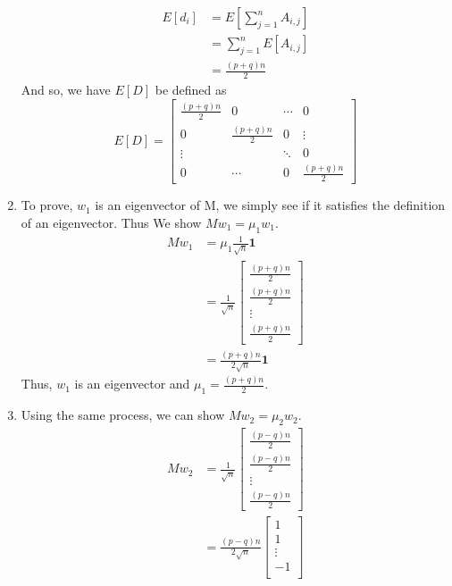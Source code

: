 \documentclass[11pt]{article}
\begin{document}
\begin{enumerate}
	\begin{align*}
		E[d_{i}] &= E \left[ \sum_{j=1}^n A_{i,j} \right] \\
		&= \sum_{j=1}^n E \left[ A_{i,j} \right] \\
		&= \frac{(p + q)n}{2}
	\end{align*}
	And so, we have $E[D]$ be defined as
	\begin{equation}
		E[D] =
		\begin{bmatrix}
		\frac{(p + q)n}{2} & 0 & \cdots & 0\\
		0 & \frac{(p + q)n}{2} & 0 & \vdots \\
		\vdots & & \ddots & 0 \\
		0 & \cdots & 0 & \frac{(p + q)n}{2}
		\end{bmatrix}
	\end{equation}
	\item To prove, $w_1$ is an eigenvector of M, we simply see if it satisfies the definition of an eigenvector. Thus
	We show $M w_1 = \mu_1 w_1$.
	\begin{align*}
		M w_1 &= \mu_1 \frac{1}{\sqrt{n}} \textbf{1} \\
		&= \frac{1}{\sqrt{n}} \begin{bmatrix}
			\frac{(p + q)n}{2} \\
			\frac{(p + q)n}{2} \\
			\vdots \\
			\frac{(p + q)n}{2}
		\end{bmatrix} \\
		&= \frac{(p + q)n}{2 \sqrt{n}} \textbf{1}
	\end{align*}
	Thus, $w_1$ is an eigenvector and $\boxed{\mu_1 = \frac{(p + q)n}{2}}$.
	\item Using the same process, we can show $M w_2 = \mu_2 w_2$. \\
	\begin{align*}
	M w_2 &= \frac{1}{\sqrt{n}}
	\begin{bmatrix}
		\frac{(p - q)n}{2} \\
		\frac{(p - q)n}{2} \\
		\vdots \\
		\frac{(p - q)n}{2}
	\end{bmatrix} \\
	&= \frac{(p - q)n}{2 \sqrt{n}}
		\begin{bmatrix}
		1 \\
		1 \\
		\vdots \\
		-1 \\

\end{bmatrix}
\end{align*}
\end{enumerate}
\end{document}

